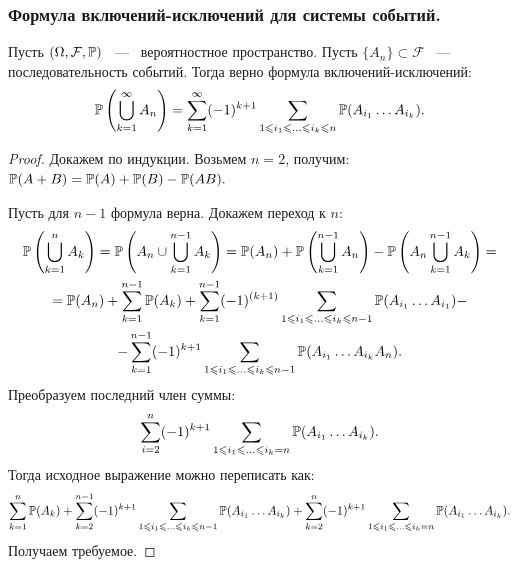 \subsubsection{Формула включений-исключений для системы событий.}
\begin{theorem}
    Пусть $(\Omega, \mathcal{F}, \P)$ ~---~ вероятностное пространство. Пусть $\{A_n\} \subset \mathcal{F}$ ~---~ последовательность событий. Тогда верно формула включений-исключений: 
    \begin{equation*}
        \P\left(\bigcup\limits_{k = 1}^{\infty}A_n\right) = \sum\limits_{k = 1}^{\infty} (-1)^{k + 1} \sum\limits_{1 \le i_1 \le \dots \le i_k \le n} \P(A_{i_1}\dots A_{i_k}).
    \end{equation*}
\end{theorem}
\begin{proof}
\noindent Докажем по индукции. Возьмем $n = 2$, получим: $\P(A + B) = \P(A) + \P(B) - \P(AB).$

\noindent Пусть для $n - 1$ формула верна. Докажем переход к $n$:
\begin{gather*}
    \P\left(\bigcup\limits_{k = 1}^{n} A_k\right) = \P\left(A_n \cup \bigcup\limits_{k = 1}^{n - 1}A_k\right) = \P(A_n) + \P\left(\bigcup\limits_{k = 1}^{n - 1}A_n\right) - \P\left(A_n\bigcup\limits_{k = 1}^{n - 1}A_k\right) =  \\ 
    = \P(A_n) + \sum\limits_{k = 1}^{n - 1} \P(A_k) + \sum\limits_{k = 1}^{n - 1}(-1)^{(k + 1)}\sum\limits_{1 \le i_1 \le \dots \le i_k \le n - 1} \P(A_{i_1} \dots A_{i_1}) - \\ 
    - \sum\limits_{k = 1}^{n - 1}(-1)^{k + 1}\sum\limits_{1 \le i_1 \le \dots \le i_k \le n - 1} \P(A_{i_1} \dots A_{i_k} A_n).
\end{gather*}
\noindent Преобразуем последний член суммы: 
\begin{gather*}
    \sum\limits_{i = 2}^{n}(-1)^{k + 1}\sum\limits_{1 \le i_{1} \le \dots \le i_k = n} \P(A_{i_1}\dots A_{i_k}).
\end{gather*}
Тогда исходное выражение можно переписать как: 
\begin{gather*}
    \sum\limits_{k = 1}^{n} \P(A_k) + \sum\limits_{k = 2}^{n - 1} (-1)^{k + 1}\sum\limits_{1 \le i_1 \le \dots \le i_k \le n - 1} \P(A_{i_1}\dots A_{i_k}) + \sum\limits_{k = 2}^{n}(-1)^{k + 1} \sum\limits_{1 \le i_1 \le \dots \le i_k = n} \P(A_{i_1} \dots A_{i_k}).
\end{gather*}
Получаем требуемое.
\end{proof}


